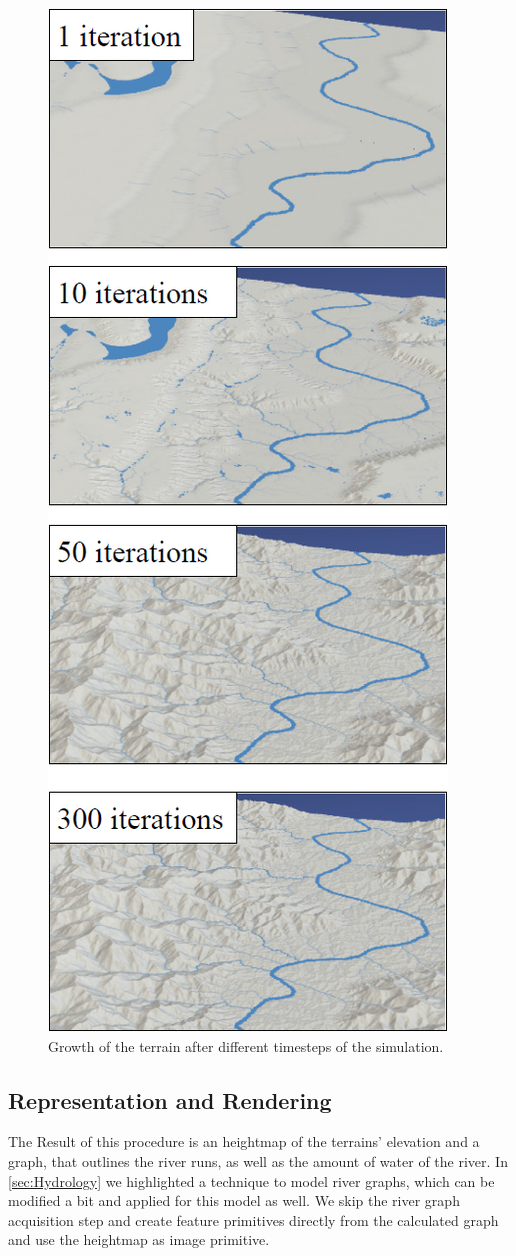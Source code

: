 \begin{figure}[htb]	
	\centering
	\includegraphics[width=0.8\linewidth]{cordonnier2016large/iterations}
	\caption{Growth of the terrain after different timesteps of the simulation.}
	\label{fig:iterations}
\end{figure}

\subsection{Representation and Rendering}
The Result of this procedure is an heightmap of the terrains' elevation and a graph, that outlines the river runs, as well as the amount of water of the river. 
In \ref{sec:Hydrology} we highlighted a technique to model river graphs, which can be modified a bit and applied for this model as well. We skip the river graph acquisition step and create feature primitives directly from the calculated graph and use the heightmap as image primitive.  